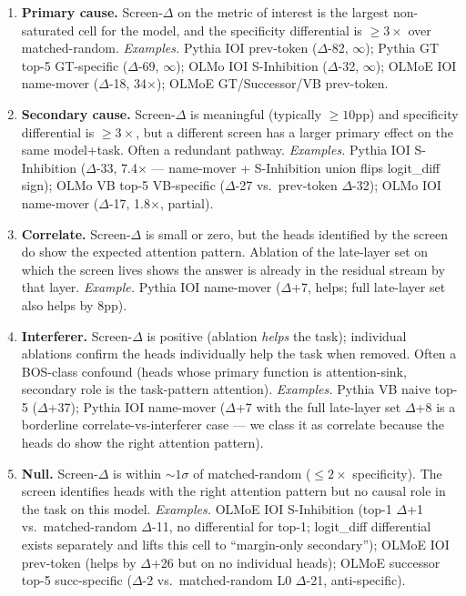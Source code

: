 \documentclass[11pt]{article}
\begin{document}
\begin{enumerate}[topsep=2pt,itemsep=4pt]
\item \textbf{Primary cause.} Screen-$\Delta$ on the metric of interest is the largest non-saturated cell for the model, and the specificity differential is $\geq 3\times$ over matched-random.
\emph{Examples.} Pythia IOI prev-token ($\Delta$-82, $\infty$); Pythia GT top-5 GT-specific ($\Delta$-69, $\infty$); OLMo IOI S-Inhibition ($\Delta$-32, $\infty$); OLMoE IOI name-mover ($\Delta$-18, 34$\times$); OLMoE GT/Successor/VB prev-token.

\item \textbf{Secondary cause.} Screen-$\Delta$ is meaningful (typically $\geq 10$pp) and specificity differential is $\geq 3\times$, but a different screen has a larger primary effect on the same model+task. Often a redundant pathway.
\emph{Examples.} Pythia IOI S-Inhibition ($\Delta$-33, 7.4$\times$ --- name-mover + S-Inhibition union flips logit\_diff sign); OLMo VB top-5 VB-specific ($\Delta$-27 vs.\ prev-token $\Delta$-32); OLMo IOI name-mover ($\Delta$-17, 1.8$\times$, partial).

\item \textbf{Correlate.} Screen-$\Delta$ is small or zero, but the heads identified by the screen do show the expected attention pattern. Ablation of the late-layer set on which the screen lives shows the answer is already in the residual stream by that layer.
\emph{Example.} Pythia IOI name-mover ($\Delta$+7, helps; full late-layer set also helps by 8pp).

\item \textbf{Interferer.} Screen-$\Delta$ is positive (ablation \emph{helps} the task); individual ablations confirm the heads individually help the task when removed. Often a BOS-class confound (heads whose primary function is attention-sink, secondary role is the task-pattern attention).
\emph{Examples.} Pythia VB naive top-5 ($\Delta$+37); Pythia IOI name-mover ($\Delta$+7 with the full late-layer set $\Delta$+8 is a borderline correlate-vs-interferer case --- we class it as correlate because the heads do show the right attention pattern).

\item \textbf{Null.} Screen-$\Delta$ is within $\sim 1\sigma$ of matched-random ($\leq 2\times$ specificity). The screen identifies heads with the right attention pattern but no causal role in the task on this model.
\emph{Examples.} OLMoE IOI S-Inhibition (top-1 $\Delta$+1 vs.\ matched-random $\Delta$-11, no differential for top-1; logit\_diff differential exists separately and lifts this cell to ``margin-only secondary''); OLMoE IOI prev-token (helps by $\Delta$+26 but on no individual heads); OLMoE successor top-5 succ-specific ($\Delta$-2 vs.\ matched-random L0 $\Delta$-21, anti-specific).
\end{enumerate}
\end{document}
